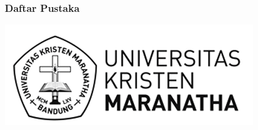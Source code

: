 \documentclass[pdf]{beamer}
\theoremstyle{mystyle}
\begin{document}
\begin{frame}[allowframebreaks]
  \frametitle<presentation>{Daftar Pustaka}
    {\footnotesize
    
    
    }    
\end{frame}





\begin{frame}[plain]
		\centering\includegraphics[scale=0.5]{Logo-Maranatha-Untuk-Belakang-02}	
\end{frame}
\end{document}
